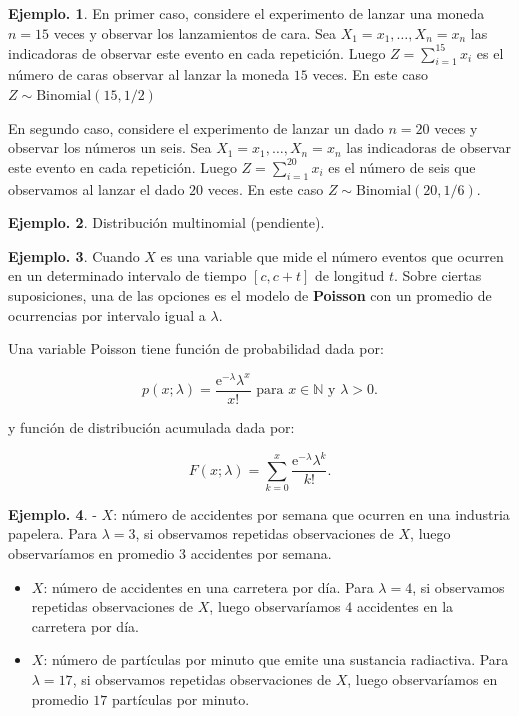 \documentclass[]{book}
\theoremstyle{definition}
\theoremstyle{definition}
\newtheorem{example}{Ejemplo.}[chapter]
\theoremstyle{definition}
\theoremstyle{remark}
\begin{document}
\begin{example}
\protect\hypertarget{exm:unnamed-chunk-111}{}{\label{exm:unnamed-chunk-111} }
En primer caso, considere el experimento de lanzar una moneda
\(n=15\) veces y observar los lanzamientos de cara. Sea
\(X_1=x_1,\ldots, X_n=x_n\) las indicadoras de observar este
evento en cada repetición. Luego \(Z= \sum_{i=1}^{15}x_i\) es
el número de caras observar al lanzar la moneda \(15\) veces.
En este caso \(Z \sim \mbox{Binomial}(15, 1/2)\)

En segundo caso, considere el experimento de lanzar un dado
\(n=20\) veces y observar los números un seis. Sea
\(X_1=x_1,\ldots, X_n=x_n\) las indicadoras de observar este
evento en cada repetición. Luego \(Z= \sum_{i=1}^{20}x_i\) es
el número de seis que observamos al lanzar el dado \(20\)
veces. En este caso \(Z \sim \mbox{Binomial}(20, 1/6)\).
\end{example}

\begin{example}
\protect\hypertarget{exm:unnamed-chunk-112}{}{\label{exm:unnamed-chunk-112} }
Distribución multinomial (pendiente).
\end{example}

\begin{example}
\protect\hypertarget{exm:unnamed-chunk-113}{}{\label{exm:unnamed-chunk-113} }
Cuando \(X\) es una variable que mide el número eventos que
ocurren en un determinado intervalo de tiempo \([c,c+t]\) de
longitud \(t\). Sobre ciertas suposiciones, una de las opciones es
el modelo de \textbf{Poisson} con un promedio de ocurrencias por
intervalo igual a \(\lambda\).

Una variable Poisson tiene función de probabilidad dada por:

\[ p(x;\lambda)=\frac{ \mbox{e}^{-\lambda}\lambda^{x} }{x!}
   \mbox{ para } x\in \mathbb{N} \mbox{ y } \lambda >0. \]

y función de distribución acumulada dada por:

\[F(x; \lambda)= \sum_{k=0}^{x}
  \frac{\mbox{e}^{-\lambda}\lambda^{k}}{k!}.   \]
\end{example}

\begin{example}
\protect\hypertarget{exm:unnamed-chunk-114}{}{\label{exm:unnamed-chunk-114} }
- \(X\): número de accidentes por semana que ocurren en una
industria papelera. Para \(\lambda=3\), si observamos repetidas
observaciones de \(X\), luego observaríamos en promedio \(3\)
accidentes por semana.

\begin{itemize}
\item
  \(X\): número de accidentes en una carretera por día. Para
  \(\lambda=4\), si observamos repetidas observaciones de \(X\), luego
  observaríamos \(4\) accidentes en la carretera por día.
\item
  \(X\): número de partículas por minuto que emite una
  sustancia radiactiva. Para \(\lambda=17\), si observamos
  repetidas observaciones de \(X\), luego observaríamos en promedio
  \(17\) partículas por minuto.
\end{itemize}
\end{example}
\end{document}
